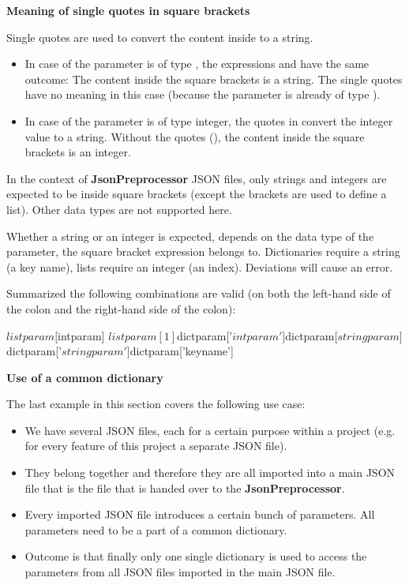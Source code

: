 \newpage

\textbf{Meaning of single quotes in square brackets}

Single quotes are used to convert the content inside to a string.

\begin{itemize}
   \item In case of the parameter  is of type , the expressions \pcode{[$\{param\}]} and \pcode{['$\{param\}']} have the same outcome:
         The content inside the square brackets is a string. The single quotes have no meaning in this case (because the parameter is already of type ).
   \item In case of the parameter  is of type integer, the quotes in \pcode{['$\{param\}']} convert the integer value to a string.
         Without the quotes (\pcode{[$\{param\}]}), the content inside the square brackets is an integer.
\end{itemize}

In the context of \textbf{JsonPreprocessor} JSON files, only strings and integers are expected to be inside square brackets (except the brackets are used to define a list).
Other data types are not supported here.

Whether a string or an integer is expected, depends on the data type of the parameter, the square bracket expression belongs to. Dictionaries require a string (a key name), lists require an integer (an index).
Deviations will cause an error.

Summarized the following combinations are valid (on both the left-hand side of the colon and the right-hand side of the colon):

\begin{pythoncode}
${listparam}[${intparam}]
${listparam}[1]
${dictparam}['${intparam}']
${dictparam}[${stringparam}]
${dictparam}['${stringparam}']
${dictparam}['keyname']
\end{pythoncode}

\vspace{2ex}

\textbf{Use of a common dictionary}

The last example in this section covers the following use case:

\begin{itemize}
   \item We have several JSON files, each for a certain purpose within a project (e.g. for every feature of this project a separate JSON file).
   \item They belong together and therefore they are all imported into a main JSON file that is the file that is handed over to the \textbf{JsonPreprocessor}.
   \item Every imported JSON file introduces a certain bunch of parameters. All parameters need to be a part of a common dictionary.
   \item Outcome is that finally only one single dictionary is used to access the parameters from all JSON files imported in the main JSON file.
\end{itemize}

